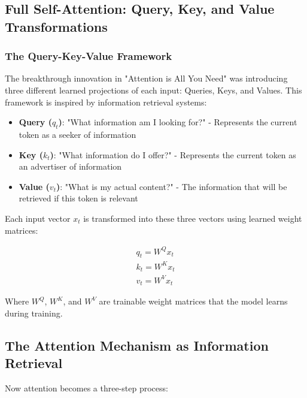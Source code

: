 \subsection{Full Self-Attention: Query, Key, and Value Transformations}

\subsubsection{The Query-Key-Value Framework}

The breakthrough innovation in "Attention is All You Need" \cite{vaswani2017attention} was introducing three different learned projections of each input: Queries, Keys, and Values. This framework is inspired by information retrieval systems:

\begin{itemize}
  \item \textbf{Query ($q_t$)}: "What information am I looking for?" - Represents the current token as a seeker of information
  \item \textbf{Key ($k_t$)}: "What information do I offer?" - Represents the current token as an advertiser of information
  \item \textbf{Value ($v_t$)}: "What is my actual content?" - The information that will be retrieved if this token is relevant
\end{itemize}

Each input vector $x_t$ is transformed into these three vectors using learned weight matrices:

\begin{gather*}
  q_t = W^Q x_t\\
  k_t = W^K x_t\\
  v_t = W^V x_t
\end{gather*}

Where $W^Q$, $W^K$, and $W^V$ are trainable weight matrices that the model learns during training.

\subsection{The Attention Mechanism as Information Retrieval}

Now attention becomes a three-step process:

